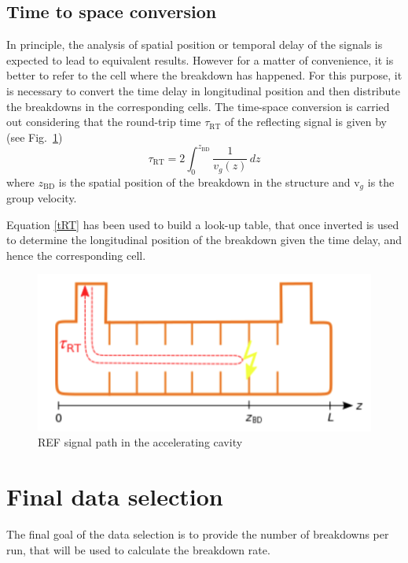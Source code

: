 \subsection[Time to space conversion]{Time to space conversion}

In principle, the analysis of spatial position or temporal delay of the signals is expected to lead to equivalent results. However for a matter of convenience, it is better to refer to the cell where the breakdown has happened. For this purpose, it is necessary to convert the time delay in longitudinal position and then distribute the breakdowns in the corresponding cells. The time-space conversion is carried out considering that the round-trip time $\tau_{\text{RT}}$  of the reflecting signal is given by (see Fig.~\ref{tToz_p})
\begin{equation}
\tau_{\text{RT}} = 2 \int_0^{z_{\text{BD}}} \frac{1}{v_g (z)} \, dz
\label{tRT}
\end{equation}
where $z_{\text{BD}}$ is the spatial position of the breakdown in the structure and v$_g$ is the group velocity.

Equation \ref{tRT} has been used to build a look-up table, that once inverted is used to determine the longitudinal position of the breakdown given the time delay, and hence the corresponding cell.


\begin{figure}[h]
\centering 
\includegraphics[scale=0.3]{pictures/tToz}
\caption{REF signal path in the accelerating cavity}
\label{tToz_p}
\end{figure}




\section[Final data selection]{Final data selection}
\label{sec:BDR}

The final goal of the data selection is to provide the number of breakdowns per run, that will be used to calculate the breakdown rate. 

